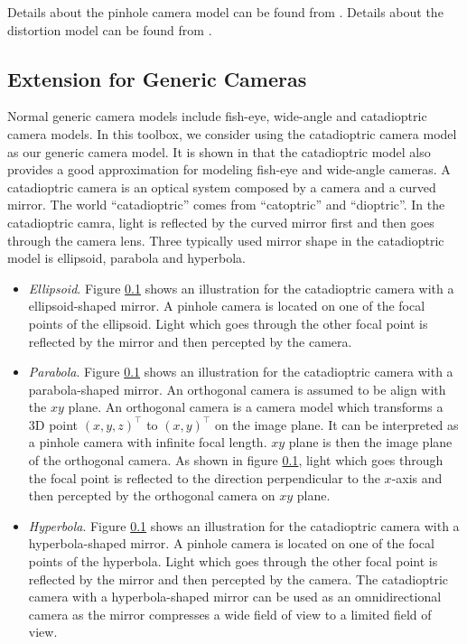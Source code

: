 \documentclass{report}
\begin{document}
Details about the pinhole camera model can be found from \cite{hartley2000multiple}. Details about the distortion model can be found from \cite{}. 

\subsection{Extension for Generic Cameras}
Normal generic camera models include fish-eye, wide-angle and catadioptric camera models. In this toolbox, we consider using the catadioptric camera model as our generic camera model. It is shown in \cite{} that the catadioptric model also provides a good approximation for modeling fish-eye and wide-angle cameras. A catadioptric camera is an optical system composed by a camera and a curved mirror. The world ``catadioptric'' comes from ``catoptric'' and ``dioptric''. In the catadioptric camra, light is reflected by the curved mirror first and then goes through the camera lens. Three typically used mirror shape in the catadioptric model is ellipsoid, parabola and hyperbola. 
\begin{itemize}
	\item \textit{Ellipsoid}. Figure \ref{} shows an illustration for the catadioptric camera with a ellipsoid-shaped mirror. A pinhole camera is located on one of the focal points of the ellipsoid. Light which goes through the other focal point is reflected by the mirror and then percepted by the camera. 
	\item \textit{Parabola}. Figure \ref{} shows an illustration for the catadioptric camera with a parabola-shaped mirror. An orthogonal camera is assumed to be align with the $xy$ plane. An orthogonal camera is a camera model which transforms a 3D point $(x, y, z)^\top$ to $(x, y)^\top$ on the image plane. It can be interpreted as a pinhole camera with infinite focal length. $xy$ plane is then the image plane of the orthogonal camera. As shown in figure \ref{}, light which goes through the focal point is reflected to the direction perpendicular to the $x$-axis and then percepted by the orthogonal camera on $xy$ plane. 
	\item \textit{Hyperbola}. Figure \ref{} shows an illustration for the catadioptric camera with a hyperbola-shaped mirror. A pinhole camera is located on one of the focal points of the hyperbola. Light which goes through the other focal point is reflected by the mirror and then percepted by the camera. The catadioptric camera with a hyperbola-shaped mirror can be used as an omnidirectional camera as the mirror compresses a wide field of view to a limited field of view. 
\end{itemize}
\end{document}
